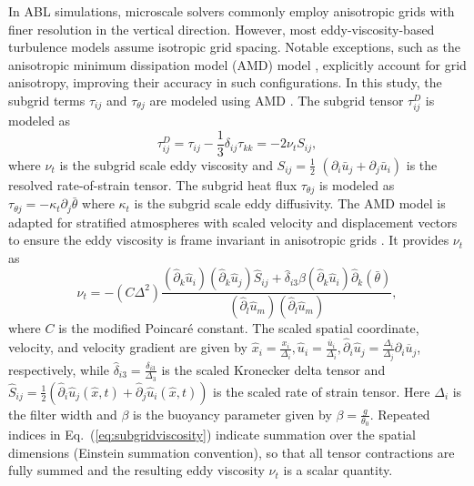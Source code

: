 In ABL simulations, microscale solvers commonly employ anisotropic grids with finer resolution in the vertical direction. However, most eddy-viscosity-based turbulence models assume isotropic grid spacing. Notable exceptions, such as the anisotropic minimum dissipation model (AMD) model \citep{Moser2021}, explicitly account for grid anisotropy, improving their accuracy in such configurations. In this study, the subgrid terms $\tau_{i j}$ and $\tau_{\theta j}$ are modeled using AMD \citep{rozema2015, AbkarAMD2016}.  The subgrid tensor $\tau_{ij}^{D}$ is modeled as
\begin{equation}
\tau_{i j}^D=\tau_{i j}-\frac{1}{3} \delta_{i j} \tau_{k k}=-2 \nu_tS_{i j},
\end{equation}
where $\nu_{t}$ is the subgrid scale eddy viscosity and $S_{ij}=\frac{1}{2}$ $\left(\partial_i \bar{u}_j+\partial_j \bar{u}_i\right)$ is the resolved rate-of-strain tensor. The subgrid heat flux  $\tau_{\theta j} $ is modeled as $\tau_{\theta j}=-\kappa_{t} \partial_j \bar{\theta}$ where $\kappa_{t}$ is the subgrid scale eddy diffusivity. The AMD model is adapted for stratified atmospheres \citep{Abkar2017} with scaled velocity and displacement vectors to ensure the eddy viscosity is frame invariant in anisotropic grids \citep{Verstappen2018}. It provides $\nu_t$ as 
\begin{equation}
\nu_t=-\left(C \Delta^2\right)\frac{\left(\hat{\partial}_k \hat{u}_i\right)\left(\hat{\partial}_k \hat{u}_j\right) \hat{S}_{i j}+\hat{\delta}_{i 3} \beta\left(\hat{\partial}_k \hat{u}_i\right) \hat{\partial}_k(\bar{\theta})}{\left(\hat{\partial}_l \hat{u}_m\right)\left(\hat{\partial}_l \hat{u}_m\right)},
\label{eq:subgridviscosity}
\end{equation}
%
where $C$ is the modified Poincar\'e constant. The scaled spatial coordinate, velocity, and velocity gradient are given by 
$\hat{x}_i=\frac{x_i}{\Delta_i}, \hat{u}_i=\frac{\overline u_i}{\Delta_i}, \hat{\partial}_i \hat{u}_j=\frac{\Delta_i}{\Delta_j} \partial_i \overline u_j$, respectively, while $\hat{\delta}_{i 3}=\frac{\delta_{i 3}}{\Delta_3}$ is the scaled Kronecker delta tensor and $\hat{S}_{i j}=\frac{1}{2}\left(\hat{\partial}_i \hat{u}_j(\hat{x}, t)+\hat{\partial}_j \hat{u}_i(\hat{x}, t)\right)$ is the scaled rate of strain tensor. Here $\Delta_i$ is the filter width and $\beta$ is the buoyancy parameter given by $\beta = \frac{g}{\theta_0}$. Repeated indices in Eq.~(\ref{eq:subgridviscosity}) indicate summation over the spatial dimensions (Einstein summation convention), so that all tensor contractions are fully summed and the resulting eddy viscosity $\nu_t$ is a scalar quantity.

